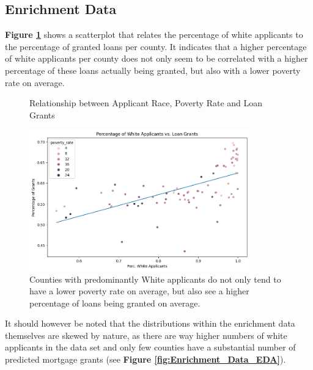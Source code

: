 \subsection{Enrichment Data}\label{subsec:Enrichment_Data}


\textbf{Figure \ref{fig:Scatter_White_Applicants_Loan_Grant}} shows a scatterplot that relates the percentage of white applicants to the percentage of granted loans per county. It indicates that a higher percentage of white applicants per county does not only seem to be correlated with a higher percentage of these loans actually being granted, but also with a lower poverty rate on average.

\begin{figure}[h]
    \centering
    \caption{Relationship between Applicant Race, Poverty Rate and Loan Grants}
    \includegraphics[width=0.85\textwidth]{images/CHXX_Perc_Grants_vs_Perc_White.png}
    \caption*{Counties with predominantly White applicants do not only tend to have a lower poverty rate on average, but also see a higher percentage of loans being granted on average.}
    \label{fig:Scatter_White_Applicants_Loan_Grant}
\end{figure}

It should however be noted that the distributions within the enrichment data themselves are skewed by nature, as there are way higher numbers of white applicants in the data set and only few counties have a substantial number of predicted mortgage grants (see \textbf{Figure \ref{fig:Enrichment_Data_EDA}}).

